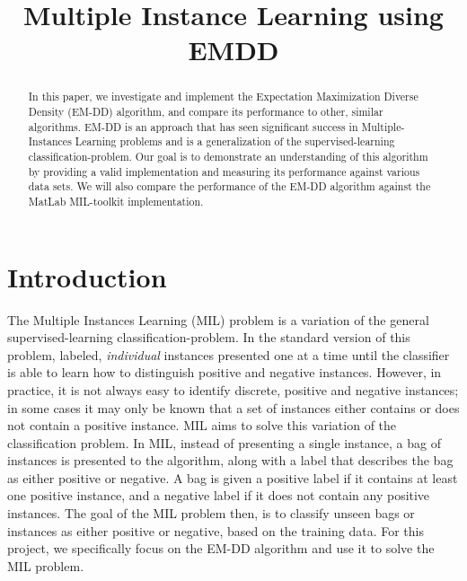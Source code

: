 \documentclass[conference]{IEEEtran}
\begin{document}
\title{Multiple Instance Learning using EMDD}

\author{
\and
{}
}

\maketitle

\begin{abstract}
In this paper, we investigate and implement the Expectation Maximization Diverse Density (EM-DD)\cite{zhang2001dd} algorithm, and compare its performance to other, similar algorithms. EM-DD is an approach that has seen significant success in Multiple-Instances Learning problems and is a generalization of the supervised-learning classification-problem. Our goal is to demonstrate an understanding of this algorithm by providing a valid implementation and measuring its performance against various data sets. We will also compare the performance of the EM-DD algorithm against the MatLab MIL-toolkit implementation.
\end{abstract}


\IEEEpeerreviewmaketitle


\section{Introduction}
The Multiple Instances Learning (MIL) problem\cite{dietterich1997solving} is a variation of the general supervised-learning classification-problem. In the standard version of this problem, labeled, \textit{individual} instances presented one at a time until the classifier is able to learn how to distinguish positive and negative instances. However, in practice, it is not always easy to identify discrete, positive and negative instances; in some cases it may only be known that a set of instances either contains or does not contain a positive instance. MIL aims to solve this variation of the classification problem. In MIL, instead of presenting a single instance, a bag of instances is presented to the algorithm, along with a label that describes the bag as either positive or negative. A bag is given a positive label if it contains at least one positive instance, and a negative label if it does not contain any positive instances. The goal of the MIL problem then, is to classify unseen bags or instances as either positive or negative, based on the training data. For this project, we specifically focus on the EM-DD algorithm and use it to solve the MIL problem. 
\end{document}
